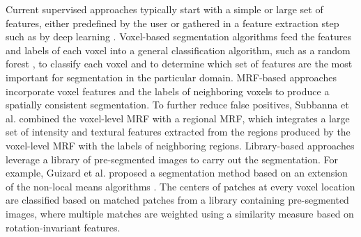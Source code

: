 
Current supervised approaches typically start with a simple or large set of
features, either predefined by the user
\cite{geremia2010,guizard2015,subbanna2015} or gathered in a feature extraction
step such as by deep learning \cite{yoo2014}. Voxel-based segmentation
algorithms \cite{geremia2010,yoo2014} feed the features and labels of each
voxel into a general classification algorithm, such as a random forest
\cite{breiman2001}, to classify each voxel and to determine which set of features are the most
important for segmentation in the particular domain. MRF-based approaches
\cite{subbanna2009,subbanna2015} incorporate voxel features and the labels of
neighboring voxels to produce a spatially consistent segmentation. To further
reduce false positives, Subbanna et al.
\cite{subbanna2015} combined the voxel-level MRF with a regional MRF, which
integrates a large set of intensity and textural features extracted from the
regions produced by the voxel-level MRF with the labels of neighboring regions.
Library-based approaches leverage a library of pre-segmented images to carry out
the segmentation. For example, Guizard et al.
\cite{guizard2015} proposed a segmentation method based on an extension of the
non-local means algorithms \cite{coupe2011}. The centers of patches at every
voxel location are classified based on matched patches from a library containing
pre-segmented images, where multiple matches are weighted using a similarity
measure based on rotation-invariant features.

